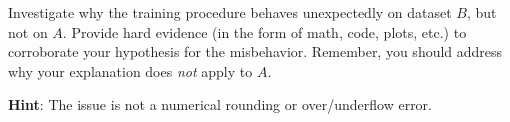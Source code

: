 \item {}
Investigate why the training procedure behaves unexpectedly on dataset $B$, but
not on $A$. Provide hard evidence (in the form of math, code, plots, etc.) to
corroborate your hypothesis for the misbehavior. Remember, you should address
why your explanation does \emph{not} apply to $A$.

\textbf{Hint}: The issue is not a numerical rounding or over/underflow error.

\ifnum{} {
  
} \fi
